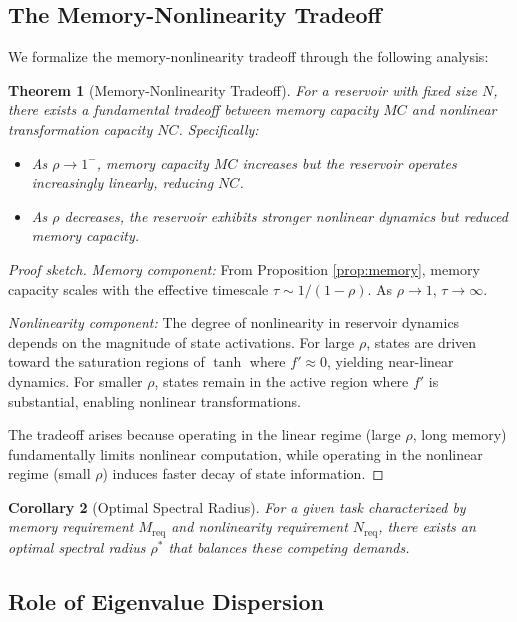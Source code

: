 \documentclass{article}
\newtheorem{theorem}{Theorem}
\newtheorem{corollary}[theorem]{Corollary}
\begin{document}
\subsection{The Memory-Nonlinearity Tradeoff}

We formalize the memory-nonlinearity tradeoff through the following analysis:

\begin{theorem}[Memory-Nonlinearity Tradeoff]
\label{thm:tradeoff}
For a reservoir with fixed size $N$, there exists a fundamental tradeoff between memory capacity $MC$ and nonlinear transformation capacity $NC$. Specifically:
\begin{itemize}
    \item As $\rho \to 1^-$, memory capacity $MC$ increases but the reservoir operates increasingly linearly, reducing $NC$.
    \item As $\rho$ decreases, the reservoir exhibits stronger nonlinear dynamics but reduced memory capacity.
\end{itemize}
\end{theorem}

\begin{proof}[Proof sketch]
\textit{Memory component:} From Proposition \ref{prop:memory}, memory capacity scales with the effective timescale $\tau \sim 1/(1-\rho)$. As $\rho \to 1$, $\tau \to \infty$.

\textit{Nonlinearity component:} The degree of nonlinearity in reservoir dynamics depends on the magnitude of state activations. For large $\rho$, states are driven toward the saturation regions of $\tanh$ where $f' \approx 0$, yielding near-linear dynamics. For smaller $\rho$, states remain in the active region where $f'$ is substantial, enabling nonlinear transformations.

The tradeoff arises because operating in the linear regime (large $\rho$, long memory) fundamentally limits nonlinear computation, while operating in the nonlinear regime (small $\rho$) induces faster decay of state information.
\end{proof}

\begin{corollary}[Optimal Spectral Radius]
For a given task characterized by memory requirement $M_{\text{req}}$ and nonlinearity requirement $N_{\text{req}}$, there exists an optimal spectral radius $\rho^*$ that balances these competing demands.
\end{corollary}

\subsection{Role of Eigenvalue Dispersion}
\end{document}
